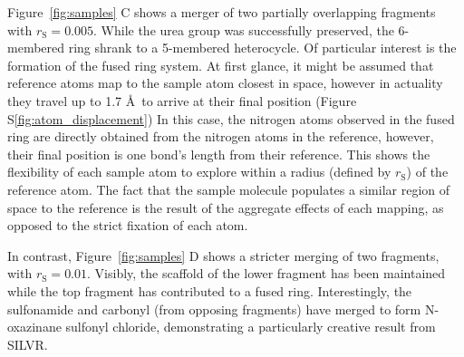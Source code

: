 \documentclass[journal=jacsat,manuscript=article]{achemso}
\begin{document}
Figure~\ref{fig:samples} C shows a merger of two partially overlapping fragments with $r_{\mathrm{S}}=0.005$. While the urea group was successfully preserved, the 6-membered ring shrank to a 5-membered heterocycle. Of particular interest is the formation of the fused ring system. At first glance, it might be assumed that reference atoms map to the sample atom closest in space, however in actuality they travel up to 1.7 \AA~to arrive at their final position (Figure S\ref{fig:atom_displacement}) In this case, the nitrogen atoms observed in the fused ring are directly obtained from the nitrogen atoms in the reference, however, their final position is one bond’s length from their reference. This shows the flexibility of each sample atom to explore within a radius (defined by $r_{\mathrm{S}}$) of the reference atom. The fact that the sample molecule populates a similar region of space to the reference is the result of the aggregate effects of each mapping, as opposed to the strict fixation of each atom. 

In contrast, Figure~\ref{fig:samples} D shows a stricter merging of two fragments, with $r_{\mathrm{S}}=0.01$. Visibly, the scaffold of the lower fragment has been maintained while the top fragment has contributed to a fused ring. Interestingly, the sulfonamide and carbonyl (from opposing fragments) have merged to form N-oxazinane sulfonyl chloride, demonstrating a particularly creative result from SILVR. 
\end{document}
